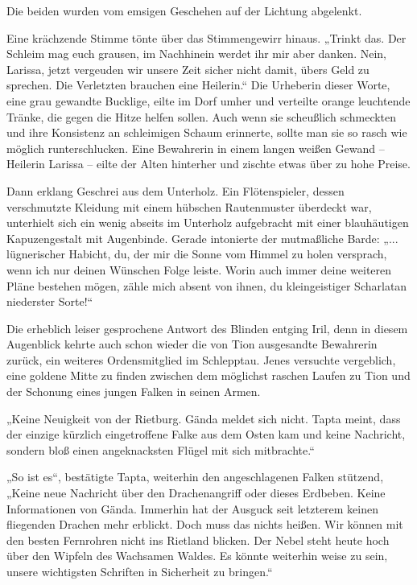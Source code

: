 Die beiden wurden vom emsigen Geschehen auf der Lichtung abgelenkt.

Eine krächzende Stimme tönte über das Stimmengewirr hinaus. „Trinkt das. Der Schleim mag euch grausen, im Nachhinein werdet ihr mir aber danken. Nein, Larissa, jetzt vergeuden wir unsere Zeit sicher nicht damit, übers Geld zu sprechen. Die Verletzten brauchen eine Heilerin.“ Die Urheberin dieser Worte, eine grau gewandte Bucklige, eilte im Dorf umher und verteilte orange leuchtende Tränke, die gegen die Hitze helfen sollen. Auch wenn sie scheußlich schmeckten und ihre Konsistenz an schleimigen Schaum erinnerte, sollte man sie so rasch wie möglich runterschlucken. Eine Bewahrerin in einem langen weißen Gewand – Heilerin Larissa – eilte der Alten hinterher und zischte etwas über zu hohe Preise.

Dann erklang Geschrei aus dem Unterholz. Ein Flötenspieler, dessen verschmutzte Kleidung mit einem hübschen Rautenmuster überdeckt war, unterhielt sich ein wenig abseits im Unterholz aufgebracht mit einer blauhäutigen Kapuzengestalt mit Augenbinde. Gerade intonierte der mutmaßliche Barde: „... lügnerischer Habicht, du, der mir die Sonne vom Himmel zu holen versprach, wenn ich nur deinen Wünschen Folge leiste. Worin auch immer deine weiteren Pläne bestehen mögen, zähle mich absent von ihnen, du kleingeistiger Scharlatan niederster Sorte!“

Die erheblich leiser gesprochene Antwort des Blinden entging Iril, denn in diesem Augenblick kehrte auch schon wieder die von Tion ausgesandte Bewahrerin zurück, ein weiteres Ordensmitglied im Schlepptau. Jenes versuchte vergeblich, eine goldene Mitte zu finden zwischen dem möglichst raschen Laufen zu Tion und der Schonung eines jungen Falken in seinen Armen.

„Keine Neuigkeit von der Rietburg. Gända meldet sich nicht. Tapta meint, dass der einzige kürzlich eingetroffene Falke aus dem Osten kam und keine Nachricht, sondern bloß einen angeknacksten Flügel mit sich mitbrachte.“

„So ist es“, bestätigte Tapta, weiterhin den angeschlagenen Falken stützend, „Keine neue Nachricht über den Drachenangriff oder dieses Erdbeben. Keine Informationen von Gända. Immerhin hat der Ausguck seit letzterem keinen fliegenden Drachen mehr erblickt. Doch muss das nichts heißen. Wir können mit den besten Fernrohren nicht ins Rietland blicken. Der Nebel steht heute hoch über den Wipfeln des Wachsamen Waldes. Es könnte weiterhin weise zu sein, unsere wichtigsten Schriften in Sicherheit zu bringen.“

